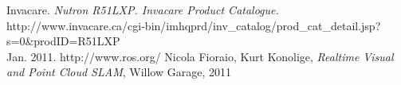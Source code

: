 \documentclass[oneside,final,a4paper]{report}
\begin{document}
\begin{thebibliography}{9}
  Invacare. \emph{Nutron R51LXP. Invacare Product Catalogue.} \\
  http://www.invacare.ca/cgi-bin/imhqprd/inv\_catalog/prod\_cat\_detail.jsp?s=0\&prodID=R51LXP\\
 Jan. 2011.
  http://www.ros.org/
  Nicola Fioraio, Kurt Konolige, \emph{Realtime Visual and Point Cloud SLAM}, Willow Garage, 2011
\end{thebibliography}
\end{document}
